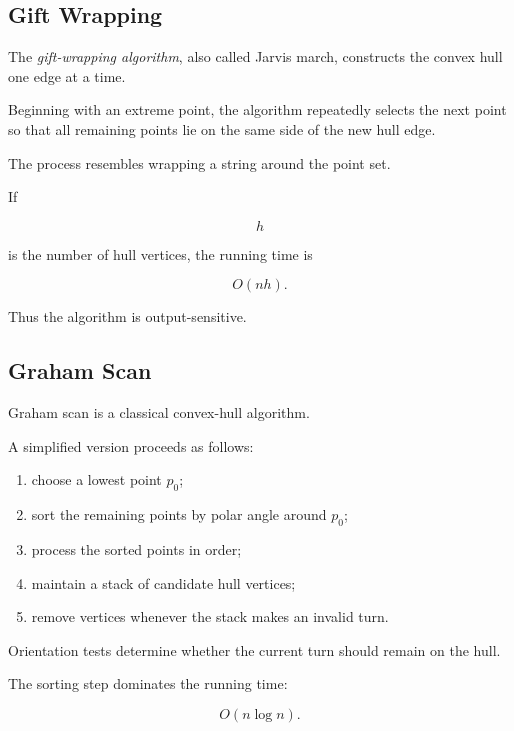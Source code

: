\subsection{Gift Wrapping}
\label{subsec:gift-wrapping}

The \emph{gift-wrapping algorithm}, also called Jarvis march, constructs the
convex hull one edge at a time.

Beginning with an extreme point, the algorithm repeatedly selects the next
point so that all remaining points lie on the same side of the new hull
edge.

The process resembles wrapping a string around the point set.

If

\[
h
\]

is the number of hull vertices, the running time is

\[
\boxed{
O(nh).
}
\]

Thus the algorithm is output-sensitive.

\subsection{Graham Scan}
\label{subsec:graham-scan}

Graham scan is a classical convex-hull algorithm.

A simplified version proceeds as follows:

\begin{enumerate}
    \item choose a lowest point \(p_0\);
    \item sort the remaining points by polar angle around \(p_0\);
    \item process the sorted points in order;
    \item maintain a stack of candidate hull vertices;
    \item remove vertices whenever the stack makes an invalid turn.
\end{enumerate}

Orientation tests determine whether the current turn should remain on the
hull.

The sorting step dominates the running time:

\[
\boxed{
O(n\log n).
}
\]


